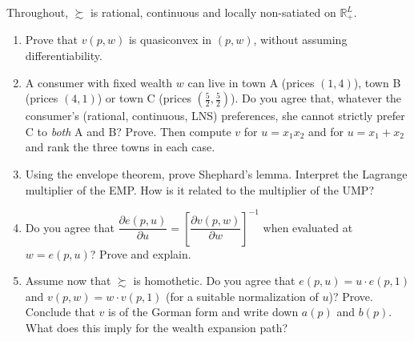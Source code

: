 \documentclass[11pt]{article}
\newcommand{\R}{\mathbb{R}}
\newcommand{\pref}{\succsim}
\begin{document}
Throughout, $\pref$ is rational, continuous and locally non-satiated on $\R^L_+$.
\begin{enumerate}[label=\textbf{4.\arabic*}]
  \item Prove that $v(p,w)$ is quasiconvex in $(p,w)$, without assuming differentiability.
  \item A consumer with fixed wealth $w$ can live in town A (prices $(1,4)$), town B (prices $(4,1)$) or town C (prices $(\tfrac52,\tfrac52)$). Do you agree that, whatever the consumer's (rational, continuous, LNS) preferences, she cannot strictly prefer C to \emph{both} A and B? Prove. Then compute $v$ for $u=x_1x_2$ and for $u=x_1+x_2$ and rank the three towns in each case.
  \item Using the envelope theorem, prove Shephard's lemma. Interpret the Lagrange multiplier of the EMP. How is it related to the multiplier of the UMP?
  \item Do you agree that $\dfrac{\partial e(p,u)}{\partial u}=\left[\dfrac{\partial v(p,w)}{\partial w}\right]^{-1}$ when evaluated at $w=e(p,u)$? Prove and explain.
  \item Assume now that $\pref$ is homothetic. Do you agree that $e(p,u)=u\cdot e(p,1)$ and $v(p,w)=w\cdot v(p,1)$ (for a suitable normalization of $u$)? Prove. Conclude that $v$ is of the Gorman form and write down $a(p)$ and $b(p)$. What does this imply for the wealth expansion path?
\end{enumerate}
\end{document}
